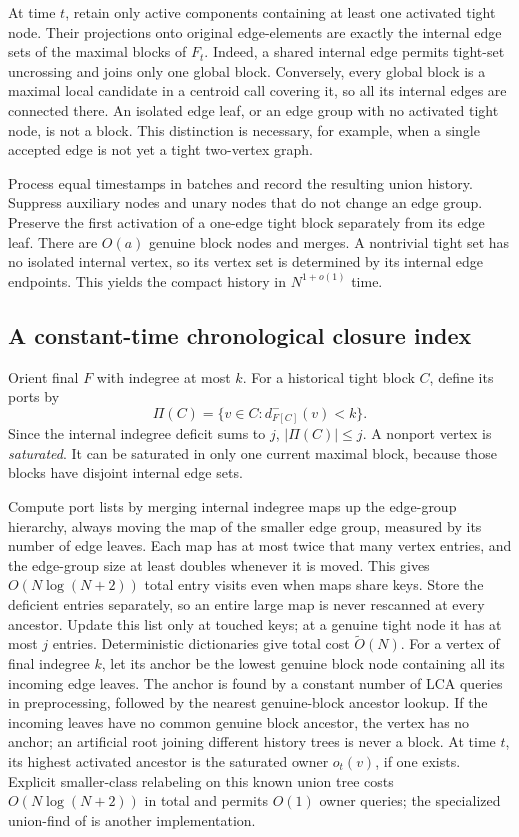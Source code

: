 \documentclass[11pt,a4paper]{article}
\theoremstyle{definition}
\theoremstyle{remark}
\newcommand{\softO}{\widetilde O}
\newcommand{\indeg}{d^-}
\begin{document}
At time $t$, retain only active components containing at least
one activated tight node. Their projections onto original
edge-elements are exactly the internal edge sets of the
maximal blocks of $F_t$. Indeed, a shared internal edge permits
tight-set uncrossing and joins only one global block.
Conversely, every global block is a maximal local candidate
in a centroid call covering it, so all its internal edges
are connected there.
An isolated edge leaf, or an edge group with no activated tight
node, is not a block. This distinction is necessary, for example,
when a single accepted edge is not yet a tight two-vertex graph.

Process equal timestamps in batches and record the resulting
union history. Suppress auxiliary nodes and unary nodes that
do not change an edge group. Preserve the first activation
of a one-edge tight block separately from its edge leaf.
There are $O(a)$ genuine block nodes and merges.
A nontrivial tight set has no isolated internal vertex, so
its vertex set is determined by its internal edge endpoints.
This yields the compact history in $N^{1+o(1)}$ time.

\subsection{A constant-time chronological closure index}

Orient final $F$ with indegree at most $k$. For a historical
tight block $C$, define its ports by
\[
 \Pi(C)=\{v\in C:\indeg_{F[C]}(v)<k\}.
\]
Since the internal indegree deficit sums to $j$,
$|\Pi(C)|\leq j$. A nonport vertex is \emph{saturated}.
It can be saturated in only one current maximal block,
because those blocks have disjoint internal edge sets.

Compute port lists by merging internal indegree maps up the
edge-group hierarchy, always moving the map of the smaller
edge group, measured by its number of edge leaves. Each map has
at most twice that many vertex entries, and the edge-group size
at least doubles whenever it is moved. This gives
$O(N\log(N+2))$ total entry visits even when maps share keys.
Store the deficient entries separately, so an entire large
map is never rescanned at every ancestor. Update this list only
at touched keys; at a genuine tight node it has at most $j$
entries. Deterministic dictionaries give total cost
$\softO(N)$.
For a vertex of final indegree $k$, let its anchor be the
lowest genuine block node containing all its incoming edge
leaves. The anchor is found by a constant number of LCA
queries in preprocessing, followed by the nearest genuine-block
ancestor lookup. If the incoming leaves have no common genuine
block ancestor, the vertex has no anchor; an artificial root
joining different history trees is never a block. At time $t$,
its highest activated ancestor is
the saturated owner $o_t(v)$, if one exists.
Explicit smaller-class relabeling on this known union tree
costs $O(N\log(N+2))$ in total and permits $O(1)$ owner queries;
the specialized union-find of \cite{static-union} is another
implementation.
\end{document}
